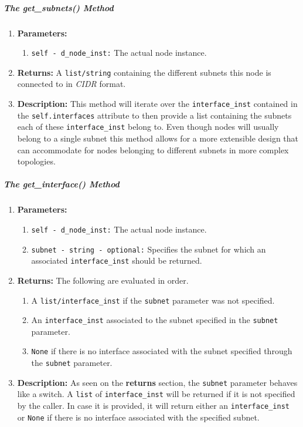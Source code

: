         \subparagraph{The get\_subnets() Method}
            \begin{enumerate}
                \item \textbf{Parameters:}
                \begin{enumerate}
                    \item \texttt{self - d\_node\_inst:} The actual node instance.
                \end{enumerate}
                \item \textbf{Returns:} A \texttt{list/string} containing the different subnets this node is connected to in \textit{CIDR} format.
                \item \textbf{Description:} This method will iterate over the \texttt{interface\_inst} contained in the \texttt{self.interfaces} attribute to then provide a list containing the subnets each of these \texttt{interface\_inst} belong to. Even though nodes will usually belong to a single subnet this method allows for a more extensible design that can accommodate for nodes belonging to different subnets in more complex topologies.
            \end{enumerate}

        \subparagraph{The get\_interface() Method}
            \begin{enumerate}
                \item \textbf{Parameters:}
                \begin{enumerate}
                    \item \texttt{self - d\_node\_inst:} The actual node instance.
                    \item \texttt{subnet - string - optional:} Specifies the subnet for which an associated \texttt{interface\_inst} should be returned.
                \end{enumerate}
                \item \textbf{Returns:} The following are evaluated in order.
                \begin{enumerate}
                    \item A \texttt{list/interface\_inst} if the \texttt{subnet} parameter was not specified.
                    \item An \texttt{interface\_inst} associated to the subnet specified in the \texttt{subnet} parameter.
                    \item \texttt{None} if there is no interface associated with the subnet specified through the \texttt{subnet} parameter.
                \end{enumerate}
                \item \textbf{Description:} As seen on the \textbf{returns} section, the \texttt{subnet} parameter behaves like a switch. A \texttt{list} of \texttt{interface\_inst} will be returned if it is not specified by the caller. In case it is provided, it will return either an \texttt{interface\_inst} or \texttt{None} if there is no interface associated with the specified subnet.
            \end{enumerate}

